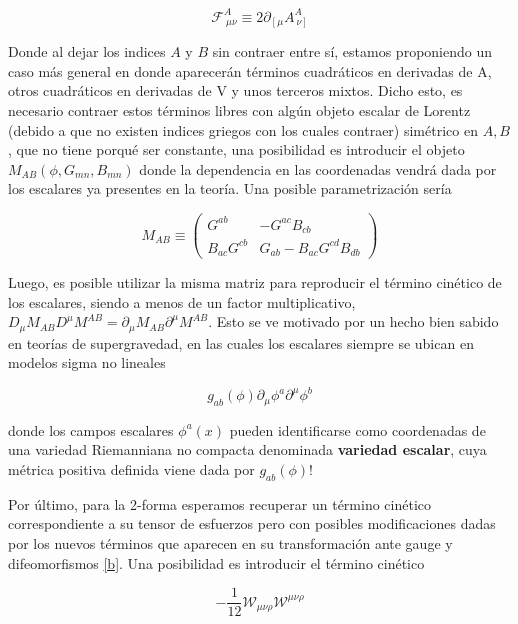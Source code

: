 \documentclass{article}
\numberwithin{equation}{section}
\begin{document}
\begin{equation}\label{F}
\mathcal{F}^A_{\ \mu \nu} \equiv 2 \partial_{\left[\mu\right.}A^A_{\ \left.\nu\right]}
\end{equation}

Donde al dejar los indices $ A $ y $ B $ sin contraer entre sí, estamos proponiendo un caso más general en donde aparecerán términos cuadráticos en derivadas de A, otros cuadráticos en derivadas de V y unos terceros mixtos. Dicho esto, es necesario contraer estos términos libres con algún objeto escalar de Lorentz (debido a que no existen indices griegos con los cuales contraer) simétrico en $ A, B $, que no tiene porqué ser constante, una posibilidad es introducir el objeto $ M_{A B} (\phi,G_{m n}, B_{m n}) $ donde la dependencia en las coordenadas vendrá dada por los escalares ya presentes en la teoría. Una posible parametrización sería

\begin{equation}\label{M}
M_{A B} \equiv \begin{pmatrix}
G^{a b} & - G^{a c} B_{c b}\\
B_{a c} G^{c b} & G_{a b} - B_{a c} G^{c d} B_{d b}
\end{pmatrix}
\end{equation}


Luego, es posible utilizar la misma matriz para reproducir el término cinético de los escalares, siendo a menos de un factor multiplicativo, $ D_{\mu} M_{A B} D^{\mu} M^{A B} = \partial_{\mu} M_{A B} \partial^{\mu} M^{A B}  $. Esto se ve motivado por un hecho bien sabido en teorías de supergravedad, en las cuales los escalares siempre se ubican en modelos sigma no lineales

\begin{equation}
	g_{a b}(\phi) \partial_{\mu} \phi^a \partial^{\mu} \phi^b
\end{equation}

donde los campos escalares $ \phi^a(x) $ pueden identificarse como coordenadas de una variedad Riemanniana no compacta denominada \textbf{variedad escalar}, cuya métrica positiva definida viene dada por $ g_{a b} (\phi) $!

Por último, para la 2-forma esperamos recuperar un término cinético correspondiente a su tensor de esfuerzos pero con posibles modificaciones dadas por los nuevos términos que aparecen en su transformación ante gauge y difeomorfismos \ref{b}. Una posibilidad es introducir el término cinético

\begin{equation}
- \frac{1}{12} \mathcal{W}_{\mu \nu \rho} \mathcal{W}^{\mu \nu \rho}
\end{equation}
\end{document}
